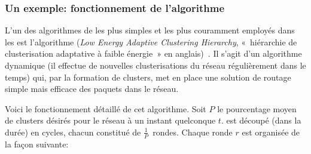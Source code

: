         \subsubsection{Un exemple: fonctionnement de l'algorithme \leach}\label{st:subsubsec:leach}
L'un des algorithmes de  les plus simples et les plus couramment employés dans les \rcsfs est l'algorithme \leach (\textit{Low Energy Adaptive Clustering Hierarchy}, \cad « hiérarchie de clusterisation adaptative à faible énergie » en anglais)~\cite{HCB00}.
Il s'agit d'un algorithme dynamique (il effectue de nouvelles clusterisations du réseau régulièrement dans le temps) qui, par la formation de clusters, met en place une solution de routage simple mais efficace des paquets dans le réseau.

Voici le fonctionnement détaillé de cet algorithme.
Soit $P$ le pourcentage moyen de clusters désirés pour le réseau à un instant quelconque $t$.
\leach est découpé (dans la durée) en cycles, chacun constitué de $\frac{1}{P}$~rondes.
Chaque ronde $r$ est organisée de la façon suivante:

